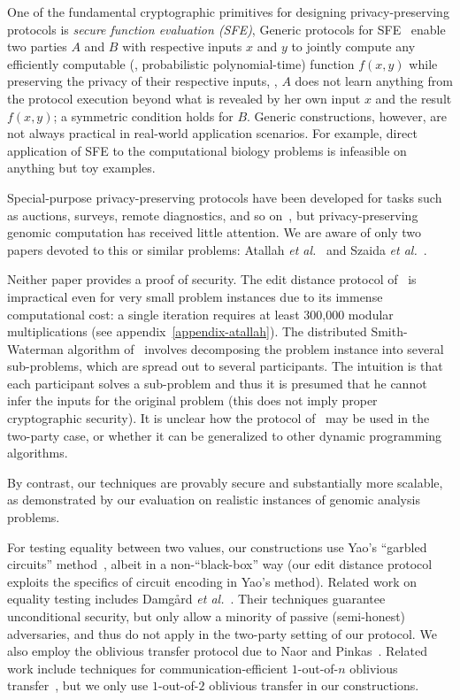 One of the fundamental cryptographic primitives for designing
privacy-preserving protocols is \emph{secure function evaluation (SFE)},
Generic protocols for SFE~\cite{GMW87,Yao86} enable two parties $A$ and
$B$ with respective inputs $x$ and $y$ to jointly compute any efficiently
computable (\ie, probabilistic polynomial-time) function $f(x,y)$ while
preserving the privacy of their respective inputs, \ie, $A$ does not learn
anything from the protocol execution beyond what is revealed by her own
input $x$ and the result $f(x,y)$; a symmetric condition holds for $B$.
Generic constructions, however, are not always practical in real-world
application scenarios.  For example, direct application of SFE to the
computational biology problems is infeasible on anything but toy examples.

Special-purpose privacy-preserving protocols have been developed
for tasks such as auctions, surveys, remote diagnostics, and so
on~\cite{FPRS04,FNP04,LP02,NPS99,BPS07}, but privacy-preserving
genomic computation has received little attention.  We are aware of
only two papers devoted to this or similar problems: Atallah \textit{et
al.}~\cite{atallah} and Szaida \textit{et al.}~\cite{Szajda:NDSS:2004}.

Neither paper provides a proof of security.  The edit distance protocol
of~\cite{atallah} is impractical even for very small problem instances due
to its immense computational cost: a single iteration requires at least
300,000 modular multiplications (see appendix~\ref{appendix-atallah}).
The distributed Smith-Waterman algorithm of~\cite{Szajda:NDSS:2004}
involves decomposing the problem instance into several sub-problems,
which are spread out to several participants.  The intuition is that
each participant solves a sub-problem and thus it is presumed that
he cannot infer the inputs for the original problem (this does not
imply proper cryptographic security).  It is unclear how the protocol
of~\cite{Szajda:NDSS:2004} may be used in the two-party case, or whether
it can be generalized to other dynamic programming algorithms.

By contrast, our techniques are provably secure and substantially more
scalable, as demonstrated by our evaluation on realistic instances of
genomic analysis problems.

For testing equality between two values, our constructions use
Yao's ``garbled circuits'' method~\cite{LP04,Yao86}, albeit in
a non-``black-box'' way (our edit distance protocol exploits the
specifics of circuit encoding in Yao's method).  Related work on
equality testing includes Damg{\aa}rd \textit{et al.}~\cite{Dam-TCC06}.
Their techniques guarantee unconditional security, but only allow a
minority of passive (semi-honest) adversaries, and thus do not apply in
the two-party setting of our protocol.  We also employ the oblivious
transfer protocol due to Naor and Pinkas~\cite{Naor-Pinkas:2001}.
Related work include techniques for communication-efficient $1$-out-of-$n$
oblivious transfer~\cite{gentry-icalp05,lipmaa-isc05}, but we only use
$1$-out-of-$2$ oblivious transfer in our constructions.

